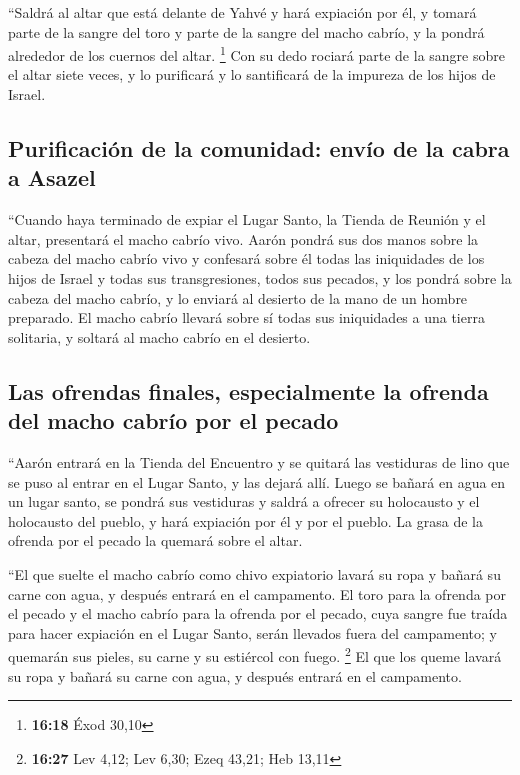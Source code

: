  ``Saldrá al altar que está delante de Yahvé y hará
expiación por él, y tomará parte de la sangre del toro y parte de la
sangre del macho cabrío, y la pondrá alrededor de los cuernos del altar.
\footnote{\textbf{16:18} Éxod 30,10}  Con su dedo rociará
parte de la sangre sobre el altar siete veces, y lo purificará y lo
santificará de la impureza de los hijos de Israel.

\hypertarget{purificaciuxf3n-de-la-comunidad-envuxedo-de-la-cabra-a-asazel}{%
\subsection{Purificación de la comunidad: envío de la cabra a
Asazel}\label{purificaciuxf3n-de-la-comunidad-envuxedo-de-la-cabra-a-asazel}}

 ``Cuando haya terminado de expiar el Lugar Santo, la
Tienda de Reunión y el altar, presentará el macho cabrío vivo.
 Aarón pondrá sus dos manos sobre la cabeza del macho
cabrío vivo y confesará sobre él todas las iniquidades de los hijos de
Israel y todas sus transgresiones, todos sus pecados, y los pondrá sobre
la cabeza del macho cabrío, y lo enviará al desierto de la mano de un
hombre preparado.  El macho cabrío llevará sobre sí todas
sus iniquidades a una tierra solitaria, y soltará al macho cabrío en el
desierto.

\hypertarget{las-ofrendas-finales-especialmente-la-ofrenda-del-macho-cabruxedo-por-el-pecado}{%
\subsection{Las ofrendas finales, especialmente la ofrenda del macho
cabrío por el
pecado}\label{las-ofrendas-finales-especialmente-la-ofrenda-del-macho-cabruxedo-por-el-pecado}}

 ``Aarón entrará en la Tienda del Encuentro y se quitará
las vestiduras de lino que se puso al entrar en el Lugar Santo, y las
dejará allí.  Luego se bañará en agua en un lugar santo,
se pondrá sus vestiduras y saldrá a ofrecer su holocausto y el
holocausto del pueblo, y hará expiación por él y por el pueblo.
 La grasa de la ofrenda por el pecado la quemará sobre el
altar.

 ``El que suelte el macho cabrío como chivo expiatorio
lavará su ropa y bañará su carne con agua, y después entrará en el
campamento.  El toro para la ofrenda por el pecado y el
macho cabrío para la ofrenda por el pecado, cuya sangre fue traída para
hacer expiación en el Lugar Santo, serán llevados fuera del campamento;
y quemarán sus pieles, su carne y su estiércol con fuego. \footnote{\textbf{16:27}
  Lev 4,12; Lev 6,30; Ezeq 43,21; Heb 13,11}  El que los
queme lavará su ropa y bañará su carne con agua, y después entrará en el
campamento.


